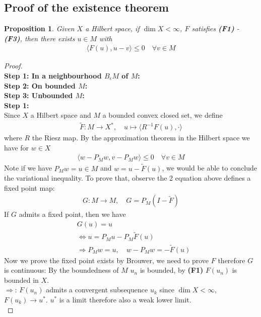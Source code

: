 \documentclass[a4paper,11pt,oneside,fleqn]{book}
\newtheorem{proposition}[theorem]{Proposition}
\theoremstyle{definition}
\theoremstyle{remark}
\begin{document}
\subsection{Proof of the existence theorem}
\begin{proposition}
Given $X$ a Hilbert space, if $\dim X < \infty$, $F$ satisfies \textbf{(F1)} - \textbf{(F3)}, then there exists $u \in M$ with
	\begin{align*}
		\langle F(u), u - v \rangle \le 0 \quad \forall v \in M
	\end{align*} 
\end{proposition}
\begin{proof}
\quad\\
\textbf{Step 1: In a neighbourhood $B_\epsilon M$ of $M$:}\\
\textbf{Step 2: On bounded $M$:}\\
\textbf{Step 3: Unbounded $M$:}\\
\textbf{Step 1:}\\
Since $X$ a Hilbert space and $M$ a bounded convex closed set, we define
\begin{align*}
	\tilde{F}: M \rightarrow X^*,\quad u \mapsto \langle R^{-1} F(u), \cdot \rangle 
\end{align*}
where $R$ the Riesz map. By the approximation theorem in the Hilbert space we have for $w \in X$
\begin{align*}
	\langle w - P_M w,  v - P_M w \rangle \le 0 \quad \forall v \in M
\end{align*}
Note if we have $P_M w = u \in M$ and $w = u - \tilde{F}(u) $, we would be able to conclude the variational inequality. To prove that, observe the 2 equation above defines a fixed point map:
\begin{align*}
	G: M \rightarrow M, \quad G =  P_M(I - \tilde{F}) 
\end{align*} 
If $G$ admits a fixed point, then we have
\begin{align*}
	&G(u) = u\\
	&\Leftrightarrow
	u = P_M u - P_M\tilde{F}(u)\\
	& \Rightarrow P_M w = u, \quad w - P_M w = - \tilde{F}(u)
\end{align*}
Now we prove the fixed point exists by Brouwer, we need to prove $F$ therefore $G$ is continuous: By the boundedness of $M$ $u_n$ is bounded, by \textbf{(F1)} $F(u_n)$ is bounded in $X$.\\
$\Rightarrow$: $F(u_n)$ admits a convergent subsequence $u_k$ since $\dim X < \infty$, $F(u_k) \rightarrow u^*$. $u^*$ is a limit therefore also a weak lower limit. \\

\end{proof}
\end{document}
